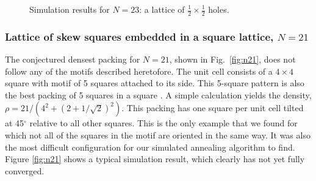 \documentclass{umthesis}          %
\begin{document}
\begin{figure}[H]
\caption{\label{fig:n23}Simulation results for $N=23$: a lattice of $\frac{1}{2} \times \frac{1}{2}$ holes.}
\end{figure}




\subsubsection{Lattice of skew squares embedded in a square lattice, $N=21$}
The conjectured densest packing for  $N=21$, shown in Fig.\ \ref{fig:n21}, does not follow any of the motifs described heretofore. The unit cell consists of a $4 \times 4$ square with motif of 5 squares attached to its side.  This 5-square pattern is also the best packing of 5 squares in a square \cite{Friedman2002}.  A simple calculation yields the density, $\rho= 21/(4^2+(2+1/\sqrt{2})^2)$. This packing has one square per unit cell tilted at 45$^{\circ}$ relative to all other squares.  This is the only example that we found for which not all of the squares in the motif are oriented in the same way. It was also the most difficult configuration for our simulated annealing algorithm to find. Figure \ref{fig:n21} shows a typical simulation result, which clearly has not yet fully converged.
\end{document}
